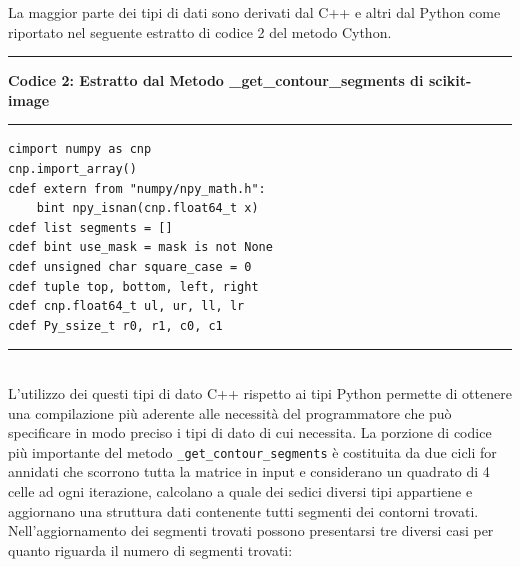\documentclass[12pt,a4paper]{report}
\begin{document}
La maggior parte dei tipi di dati sono derivati dal C++ e altri dal Python come riportato nel seguente estratto di codice 2 del metodo Cython.  \newpage
\noindent\rule[0.5ex]{\linewidth}{2pt}
\small{\textbf{Codice 2: Estratto dal Metodo \_get\_contour\_segments di scikit-image}} \\
\noindent\rule[0.5ex]{\linewidth}{1pt}
\begin{lstlisting}
cimport numpy as cnp
cnp.import_array()
cdef extern from "numpy/npy_math.h":
    bint npy_isnan(cnp.float64_t x)
cdef list segments = []
cdef bint use_mask = mask is not None
cdef unsigned char square_case = 0
cdef tuple top, bottom, left, right
cdef cnp.float64_t ul, ur, ll, lr
cdef Py_ssize_t r0, r1, c0, c1
\end{lstlisting}
\noindent\rule[0.5ex]{\linewidth}{1pt} \\[10pt]
L'utilizzo dei questi tipi di dato C++ rispetto ai tipi Python permette di ottenere una compilazione più aderente alle necessità del programmatore che può specificare in modo preciso i tipi di dato di cui necessita. \newline
La porzione di codice più importante del metodo \verb|_get_contour_segments| è costituita da due cicli for annidati che scorrono tutta la matrice in input e considerano un quadrato di 4 celle ad ogni iterazione,  calcolano a quale dei sedici diversi tipi appartiene e aggiornano una struttura dati contenente tutti segmenti dei contorni trovati. \newline
Nell'aggiornamento dei segmenti trovati possono presentarsi tre diversi casi per quanto riguarda il numero di segmenti trovati:
\end{document}

